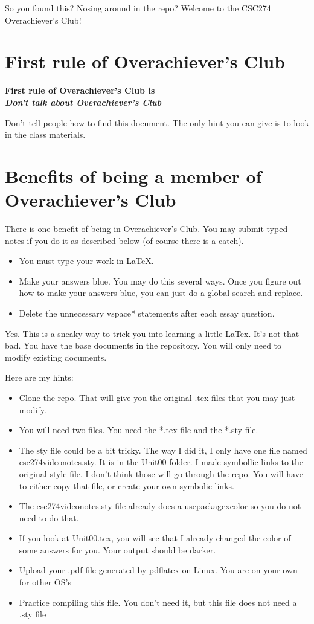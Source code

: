 \documentclass{article}
\begin{document}
So you found this?  Nosing around in the repo?  Welcome to the CSC274 Overachiever's Club!

\section*{First rule of Overachiever's Club}
\begin{center}
    \textbf{First rule of Overachiever's Club is \\\emph{Don't talk about Overachiever's Club}}
\end{center}

Don't tell people how to find this document.  The only hint you can give is to look in the class materials.

\section*{Benefits of being a member of Overachiever's Club}

There is one benefit of being in Overachiever's Club.  You may submit typed notes if you do it as
described below (of course there is a catch).
\begin{itemize}
    \item You must type your work in \LaTeX.
    \item Make your answers blue.  You may do this several ways. Once you figure out how to make your answers blue, you can just do a global search and replace.
    \item Delete the unnecessary vspace* statements after each essay question.
\end{itemize}

Yes.  This is a sneaky way to trick you into learning a little LaTex.  
It's not that bad.  You have the base documents in the repository. 
You will only need to modify existing documents.

Here are my hints:
\begin{itemize}
    \item Clone the repo.  That will give you the original .tex files that you may just modify.
    \item You will need two files.  You need the *.tex file and the *.sty file.
    \item The sty file could be a bit tricky.  The way I did it, I only have one file named csc274videonotes.sty.  It is in the Unit00 folder.  I made symbollic links to the original style file.  I don't think those will go through the repo.  You will have to either copy that file, or create your own symbolic links.
    \item The csc274videonotes.sty file already does a usepackage{xcolor} so you do not need to do that.  
    \item If you look at Unit00.tex, you will see that I already changed the color of some answers for you.  Your output should be darker.
    \item Upload your .pdf file generated by pdflatex on Linux.  You are on your own for other OS's
    \item Practice compiling this file.  You don't need it, but this file does not need a .sty file
\end{itemize}
\end{document}
